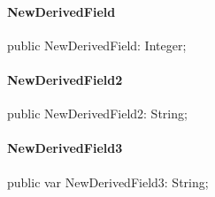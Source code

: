 \documentclass{report}
\begin{document}
\paragraph*{NewDerivedField}\hspace*{\fill}

\begin{list}{}{
\setlength{\itemindent}{0cm}
\setlength{\listparindent}{0cm}
\setlength{\leftmargin}{\evensidemargin}
\addtolength{\leftmargin}{\tmplength}
\settowidth{\labelsep}{X}
\addtolength{\leftmargin}{\labelsep}
\setlength{\labelwidth}{\tmplength}
}
\begin{flushleft}
\item[\textbf{Declaration}\hfill]
\begin{ttfamily}
public NewDerivedField: Integer;\end{ttfamily}


\end{flushleft}
\end{list}
\paragraph*{NewDerivedField2}\hspace*{\fill}

\begin{list}{}{
\setlength{\itemindent}{0cm}
\setlength{\listparindent}{0cm}
\setlength{\leftmargin}{\evensidemargin}
\addtolength{\leftmargin}{\tmplength}
\settowidth{\labelsep}{X}
\addtolength{\leftmargin}{\labelsep}
\setlength{\labelwidth}{\tmplength}
}
\begin{flushleft}
\item[\textbf{Declaration}\hfill]
\begin{ttfamily}
public NewDerivedField2: String;\end{ttfamily}


\end{flushleft}
\end{list}
\paragraph*{NewDerivedField3}\hspace*{\fill}

\begin{list}{}{
\setlength{\itemindent}{0cm}
\setlength{\listparindent}{0cm}
\setlength{\leftmargin}{\evensidemargin}
\addtolength{\leftmargin}{\tmplength}
\settowidth{\labelsep}{X}
\addtolength{\leftmargin}{\labelsep}
\setlength{\labelwidth}{\tmplength}
}
\begin{flushleft}
\item[\textbf{Declaration}\hfill]
\begin{ttfamily}
public var NewDerivedField3: String;\end{ttfamily}


\end{flushleft}
\end{list}
\end{document}
